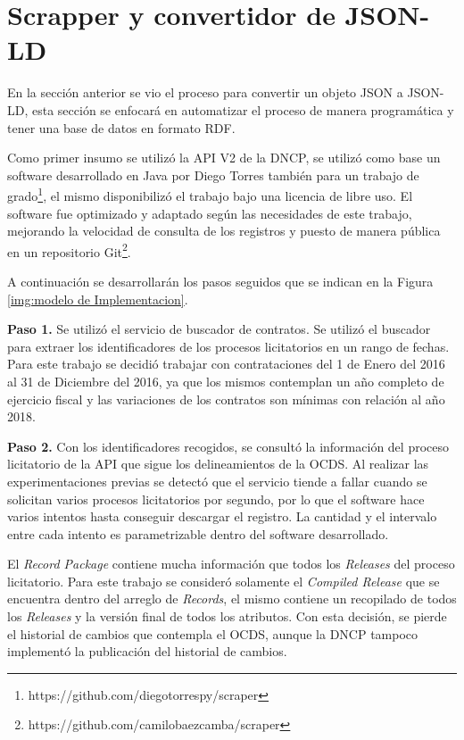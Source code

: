 \section{Scrapper y convertidor de JSON-LD}

En la sección anterior se vio el proceso para convertir un objeto JSON a JSON-LD, esta sección se enfocará en automatizar el proceso de manera programática y tener una base de datos en formato RDF.

Como primer insumo se utilizó la API V2 de la DNCP, se utilizó como base un software desarrollado en Java por Diego Torres también para un trabajo de grado\footnote{https://github.com/diegotorrespy/scraper}, el mismo disponibilizó el trabajo bajo una licencia de libre uso. El software fue optimizado y adaptado según las necesidades de este trabajo, mejorando la velocidad de consulta de los registros y puesto de manera pública en un repositorio Git\footnote{https://github.com/camilobaezcamba/scraper}.


A continuación se desarrollarán los pasos seguidos que se indican en la Figura \ref{img:modelo de Implementacion}.

\textbf{Paso 1.} Se utilizó el servicio de buscador de contratos. Se utilizó el buscador para extraer los identificadores de los procesos licitatorios en un rango de fechas. Para este trabajo se decidió trabajar con contrataciones del 1 de Enero del 2016 al 31 de Diciembre del 2016, ya que los mismos contemplan un año completo de ejercicio fiscal y las variaciones de los contratos son mínimas con relación al año 2018.



\textbf{Paso 2.} Con los identificadores recogidos, se consultó la información del proceso licitatorio de la API que sigue los delineamientos de la OCDS. Al realizar las experimentaciones previas se detectó que el servicio tiende a fallar cuando se solicitan varios procesos licitatorios por segundo, por lo que el software hace varios intentos hasta conseguir descargar el registro. La cantidad y el intervalo entre cada intento es parametrizable dentro del software desarrollado.

El \textit{Record Package} contiene mucha información que todos los \textit{Releases} del proceso licitatorio. Para este trabajo se consideró solamente el \textit{Compiled Release} que se encuentra dentro del arreglo de \textit{Records}, el mismo contiene un recopilado de todos los \textit{Releases} y la versión final de todos los atributos. Con esta decisión, se pierde el historial de cambios que contempla el OCDS, aunque la DNCP tampoco implementó la publicación del historial de cambios.

